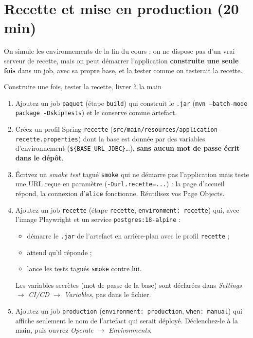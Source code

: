 \documentclass[11pt]{article}
\begin{document}
\section{Recette et mise en production (20 min)}

On simule les environnements de la fin du cours : on ne dispose pas d'un vrai serveur de recette, mais on peut démarrer l'application \textbf{construite une seule fois} dans un job, avec sa propre base, et la tester comme on testerait la recette.

\begin{exobox}{Construire une fois, tester la recette, livrer à la main}
\begin{enumerate}[leftmargin=1.4em]
  \item Ajoutez un job \texttt{paquet} (étape \texttt{build}) qui construit le \texttt{.jar} (\texttt{mvn --batch-mode package -DskipTests}) et le conserve comme artefact.
  \item Créez un profil Spring \texttt{recette} (\texttt{src/main/resources/application-recette.properties}) dont la base est donnée par des variables d'environnement (\texttt{\$\{BASE\_URL\_JDBC\}}\ldots{}), \textbf{sans aucun mot de passe écrit dans le dépôt}.
  \item Écrivez un \textit{smoke test} tagué \texttt{smoke} qui ne démarre pas l'application mais teste une URL reçue en paramètre (\texttt{-Durl.recette=...}) : la page d'accueil répond, la connexion d'\texttt{alice} fonctionne. Réutilisez vos Page Objects.
  \item Ajoutez un job \texttt{recette} (étape \texttt{recette}, \texttt{environment: recette}) qui, avec l'image Playwright et un service \texttt{postgres:18-alpine} :
  \begin{itemize}[itemsep=0pt]
    \item démarre le \texttt{.jar} de l'artefact en arrière-plan avec le profil \texttt{recette} ;
    \item attend qu'il réponde ;
    \item lance les tests tagués \texttt{smoke} contre lui.
  \end{itemize}
  Les variables secrètes (mot de passe de la base) sont déclarées dans \textit{Settings} $\rightarrow$ \textit{CI/CD} $\rightarrow$ \textit{Variables}, pas dans le fichier.
  \item Ajoutez un job \texttt{production} (\texttt{environment: production}, \texttt{when: manual}) qui affiche seulement le nom de l'artefact qui serait déployé. Déclenchez-le à la main, puis ouvrez \textit{Operate} $\rightarrow$ \textit{Environments}.
\end{enumerate}
\end{exobox}
\end{document}
